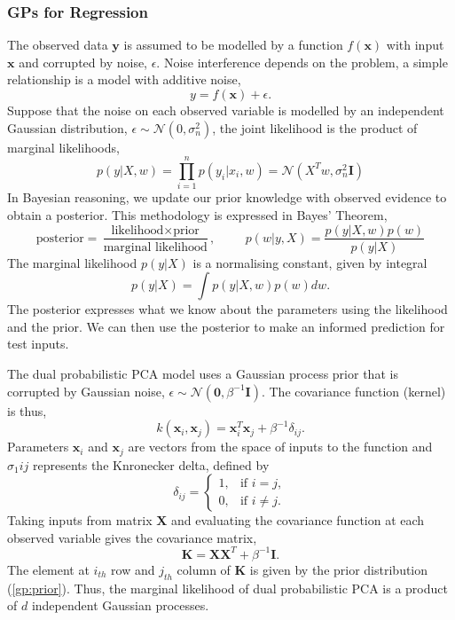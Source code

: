 \documentclass[ %
author={Dillon Keith Diep},
supervisor={Dr. Carl Henrik Ek},
degree={MEng},
title={ART-CG:},
subtitle={Assisted Real-time Content Generation of 3D Hair by Learning Manifolds},
type={Research},
year={2017} ]{dissertation}
\begin{document}
\subsubsection{GPs for Regression}
The observed data $\bm{y}$ is assumed to be modelled by a function $f(\bm{x})$ with input $\bm{x}$ and corrupted by noise, $\epsilon$. Noise interference depends on the problem, a simple relationship is a model with additive noise,
$$y = f(\bm{x}) + \epsilon.$$
Suppose that the noise on each observed variable is modelled by an independent Gaussian distribution, $\epsilon\sim\mathcal{N}(0, \sigma^2_n)$, the joint likelihood is the product of marginal likelihoods,
$$p(y|X,w)=\prod^n_{i=1}p(y_i|x_i, w)=\mathcal{N}(X^Tw, \sigma^2_n\bm{I})$$
In Bayesian reasoning, we update our prior knowledge with observed evidence to obtain a posterior. This methodology is expressed in Bayes' Theorem,
\begin{equation} \label{bayes}
\text{posterior}=\frac{\text{likelihood}\times\text{prior}}{\text{marginal likelihood}}, \hspace{1cm} p(w|y,X)=\frac{p(y|X,w)p(w)}{p(y|X)}
\end{equation}
The marginal likelihood $p(y|X)$ is a normalising constant, given by integral
$$p(y|X)=\int p(y|X,w)p(w)dw.$$
The posterior expresses what we know about the parameters using the likelihood and the prior. We can then use the posterior to make an informed prediction for test inputs.

The dual probabilistic PCA model uses a Gaussian process prior that is corrupted by Gaussian noise\cite{gplvm}, $\epsilon\sim\mathcal{N}(\bm{0},\beta^{-1}\bm{I})$.
The covariance function (kernel) is thus,
\begin{equation} \label{gp:prior}
k(\bm{x}_i,\bm{x}_j)=\bm{x}^T_i\bm{x}_j+\beta^{-1}\delta_{ij}.
\end{equation}
Parameters $\bm{x}_i$ and $\bm{x}_j$ are vectors from the space of inputs to the function and $\sigma_1{ij}$ represents the Knronecker delta, defined by 
\begin{equation} \label{kronecker}
\delta_{ij} =
\begin{cases}
1, &         \text{if } i=j,\\
0, &         \text{if } i\neq j.
\end{cases}
\end{equation}
Taking inputs from matrix $\bm{X}$ and evaluating the covariance function at each observed variable gives the covariance matrix,
$$\bm{K=XX}^T+\beta^{-1}\bm{I}.$$
The element at $i_{th}$ row and $j_{th}$ column of $\bm{K}$ is given by the prior distribution (\ref{gp:prior}). Thus, the marginal likelihood of dual probabilistic PCA is a product of $d$ independent Gaussian processes.
\end{document}
